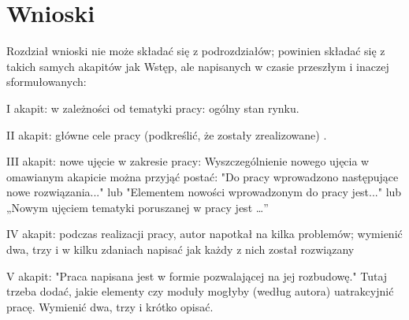 \section{Wnioski}
Rozdział wnioski nie może składać się z podrozdziałów; powinien składać się z takich
samych akapitów jak Wstęp, ale napisanych w czasie przeszłym i inaczej sformułowanych:

I akapit: w zależności od tematyki pracy: ogólny stan rynku.

II akapit: główne cele pracy (podkreślić, że zostały zrealizowane) .

III akapit: nowe ujęcie w zakresie pracy: Wyszczególnienie nowego ujęcia w omawianym
akapicie można przyjąć postać: "Do pracy wprowadzono następujące nowe
rozwiązania..." lub "Elementem nowości wprowadzonym do pracy jest..." lub „Nowym
ujęciem tematyki poruszanej w pracy jest …”

IV akapit: podczas realizacji pracy, autor napotkał na kilka problemów; wymienić dwa,
trzy i w kilku zdaniach napisać jak każdy z nich został rozwiązany

V akapit: "Praca napisana jest w formie pozwalającej na jej rozbudowę." Tutaj trzeba
dodać, jakie elementy czy moduły mogłyby (według autora) uatrakcyjnić pracę.
Wymienić dwa, trzy i krótko opisać.
